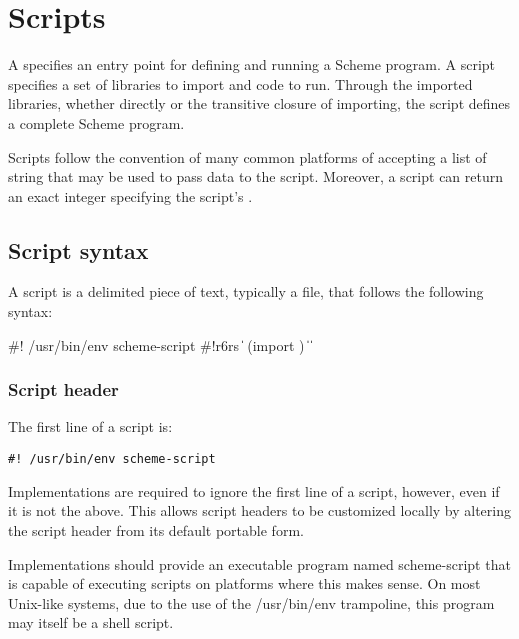 \chapter{Scripts}
\label{scriptchapter}

A  specifies an entry point for defining and running
a Scheme program.  A script specifies a set of libraries to import and
code to run.  Through the imported libraries, whether directly or the
transitive closure of importing, the script defines a complete Scheme
program.

Scripts follow the convention of many common platforms of accepting a
list of string  that may be used to
pass data to the script.  Moreover, a script can return an exact
integer specifying the script's .

\section{Script syntax}

A script is a delimited piece of text, typically a file, that follows
the following syntax:

\begin{grammar}
 \:  
 \: \#!  /usr/bin/env 
  \> scheme-script 
 \: \#!r6rs  
  \> \|  
 \: (import )
 \:  
 \: 
\> \| 
\> \| 
\end{grammar}

\subsection{Script header}

The first line of a script is:
\begin{verbatim}
#! /usr/bin/env scheme-script
\end{verbatim}
%
Implementations are required to ignore the first 
line of a script, however, even if it is not the above.
This allows script
headers to be customized locally by altering the script header from its
default portable form.

Implementations should provide an executable program named {\cf scheme-script}
that is capable of executing scripts on platforms where this makes
sense.  On most Unix-like systems, due to the 
use of the {\cf /usr/bin/env} trampoline, this program may itself be a shell 
script.

